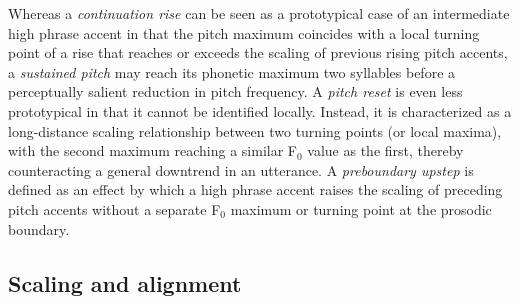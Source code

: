 Whereas a \textit{continuation rise} can be seen as a prototypical case of an intermediate high phrase accent in that the pitch maximum coincides with a local turning point of a rise that reaches or exceeds the scaling of previous rising pitch accents, a \textit{sustained pitch} may reach its phonetic maximum two syllables before a perceptually salient reduction in pitch frequency.
A \textit{pitch reset} is even less prototypical in that it cannot be identified locally. Instead, it is characterized as a long-distance scaling relationship between two turning points (or local maxima), with the second maximum reaching a similar F$_0$ value as the first, thereby counteracting a general downtrend in an utterance. A \textit{preboundary upstep} is defined as an effect by which a high phrase accent raises the scaling of preceding pitch accents without a separate F$_0$ maximum or turning point at the prosodic boundary.

\subsection{Scaling and alignment}
\label{ch:2.2.3}

